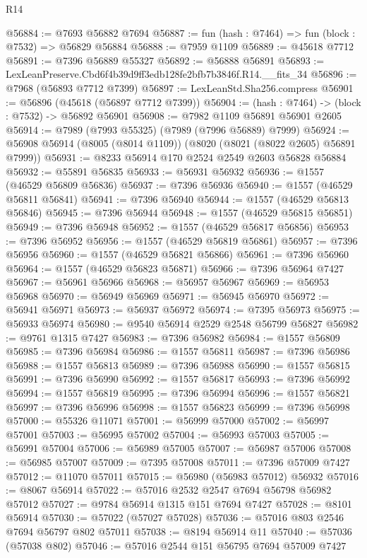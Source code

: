 \begin{lexlean}{R14}
\begin{coremodule}
@56884 := @7693 @56882 @7694
@56887 := fun (hash : @7464) => fun (block : @7532) => @56829 @56884
@56888 := @7959 @1109
@56889 := @45618 @7712
@56891 := @7396 @56889 @55327
@56892 := @56888 @56891
@56893 := LexLeanPreserve.Cbd6f4b39d9ff3edb128fe2bfb7b3846f.R14.__fits_34
@56896 := @7968 (@56893 @7712 @7399)
@56897 := LexLeanStd.Sha256.compress
@56901 := @56896 (@45618 (@56897 @7712 @7399))
@56904 := (hash : @7464) -> (block : @7532) -> @56892 @56901
@56908 := @7982 @1109 @56891 @56901 @2605
@56914 := @7989 (@7993 @55325) (@7989 (@7996 @56889) @7999)
@56924 := @56908 @56914 (@8005 (@8014 @1109)) (@8020 (@8021 (@8022 @2605) @56891 @7999))
@56931 := @8233 @56914 @170 @2524 @2549 @2603 @56828 @56884
@56932 := @55891 @56835
@56933 := @56931 @56932
@56936 := @1557 (@46529 @56809 @56836)
@56937 := @7396 @56936
@56940 := @1557 (@46529 @56811 @56841)
@56941 := @7396 @56940
@56944 := @1557 (@46529 @56813 @56846)
@56945 := @7396 @56944
@56948 := @1557 (@46529 @56815 @56851)
@56949 := @7396 @56948
@56952 := @1557 (@46529 @56817 @56856)
@56953 := @7396 @56952
@56956 := @1557 (@46529 @56819 @56861)
@56957 := @7396 @56956
@56960 := @1557 (@46529 @56821 @56866)
@56961 := @7396 @56960
@56964 := @1557 (@46529 @56823 @56871)
@56966 := @7396 @56964 @7427
@56967 := @56961 @56966
@56968 := @56957 @56967
@56969 := @56953 @56968
@56970 := @56949 @56969
@56971 := @56945 @56970
@56972 := @56941 @56971
@56973 := @56937 @56972
@56974 := @7395 @56973
@56975 := @56933 @56974
@56980 := @9540 @56914 @2529 @2548 @56799 @56827
@56982 := @9761 @1315 @7427
@56983 := @7396 @56982
@56984 := @1557 @56809
@56985 := @7396 @56984
@56986 := @1557 @56811
@56987 := @7396 @56986
@56988 := @1557 @56813
@56989 := @7396 @56988
@56990 := @1557 @56815
@56991 := @7396 @56990
@56992 := @1557 @56817
@56993 := @7396 @56992
@56994 := @1557 @56819
@56995 := @7396 @56994
@56996 := @1557 @56821
@56997 := @7396 @56996
@56998 := @1557 @56823
@56999 := @7396 @56998
@57000 := @55326 @11071
@57001 := @56999 @57000
@57002 := @56997 @57001
@57003 := @56995 @57002
@57004 := @56993 @57003
@57005 := @56991 @57004
@57006 := @56989 @57005
@57007 := @56987 @57006
@57008 := @56985 @57007
@57009 := @7395 @57008
@57011 := @7396 @57009 @7427
@57012 := @11070 @57011
@57015 := @56980 (@56983 @57012) @56932
@57016 := @8067 @56914
@57022 := @57016 @2532 @2547 @7694 @56798 @56982 @57012
@57027 := @9784 @56914 @1315 @151 @7694 @7427
@57028 := @8101 @56914
@57030 := @57022 (@57027 @57028)
@57036 := @57016 @803 @2546 @7694 @56797 @802 @57011
@57038 := @8194 @56914 @11
@57040 := @57036 (@57038 @802)
@57046 := @57016 @2544 @151 @56795 @7694 @57009 @7427

\end{coremodule}
\end{lexlean}
